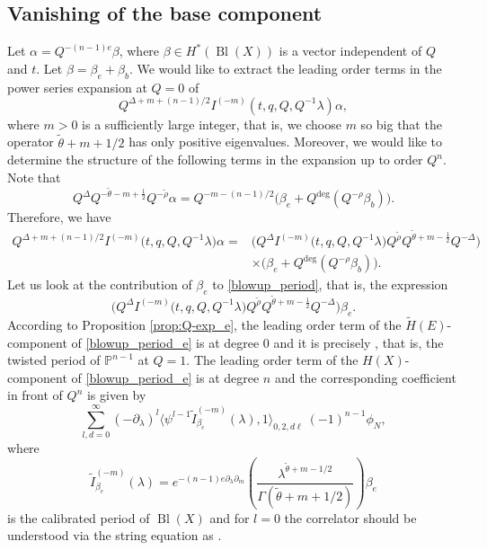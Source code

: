\documentclass[pdftex]{sigma}
\numberwithin{equation}{section}
\newcommand{\leftexp}[2]{{\vphantom{#2}}^{#1}{#2}}
\newcommand{\PP}{\mathbb{P}}
\begin{document}
\subsection{Vanishing of the base component}
Let $\alpha=Q^{-(n-1)e}\beta$, where $\beta \in H^*(\operatorname{Bl}(X))$ is a vector independent of $Q$ and $t$. Let $\beta=\beta_e+\beta_b$. We would like to extract the leading order terms in the power series expansion at $Q=0$ of
\begin{equation}\label{blowup_period}
Q^{\Delta+m+(n-1)/2} I^{(-m)}\left(t,q,Q,Q^{-1}\lambda\right)\alpha,
\end{equation}
where $m>0$ is a sufficiently large integer, that is, we choose $m$ so
big that the operator $\widetilde{\theta}+m+1/2$ has only positive
eigenvalues.
Moreover, we would like to determine the structure of the following terms in the expansion up to order $Q^n$. Note that
\[
Q^{\Delta} Q^{-\widetilde\theta-m+\frac{1}{2}}Q^{-\widetilde\rho}\alpha =
Q^{-m-(n-1)/2} \big(
\beta_e + Q^{\operatorname{deg}} (Q^{-\rho} \beta_b)
\big).
\]
Therefore, we have
\begin{align*}
Q^{\Delta+m+(n-1)/2} I^{(-m)}\big(t,q,Q,Q^{-1}\lambda\big)\alpha={}&
\big(Q^\Delta I^{(-m)}\big(t,q,Q,Q^{-1}\lambda\big)Q^{\widetilde\rho}Q^{\widetilde\theta+m-\frac{1}{2}}Q^{-\Delta}\big)\\
&\times
\big(
\beta_e + Q^{\operatorname{deg}} (Q^{-\rho} \beta_b)
\big).
\end{align*}
Let us look at the contribution of $\beta_e$ to \eqref{blowup_period}, that is, the expression
\begin{equation}\label{blowup_period_e}
\big(Q^\Delta I^{(-m)}\big(t,q,Q,Q^{-1}\lambda\big)Q^{\widetilde\rho}Q^{\widetilde\theta+m-\frac{1}{2}}Q^{-\Delta}\big)
\beta_e.
\end{equation}
According to Proposition \ref{prop:Q-exp_e}, the leading order term of the $\widetilde{H}(E)$-component of \eqref{blowup_period_e} is at degree 0 and it is precisely \smash{$\leftexp{tw}{I}_{\beta_e}^{(-m)}(1,\lambda)$}, that is, the twisted period of $\PP^{n-1}$ at $Q=1$. The leading order term of the $H(X)$-component of \eqref{blowup_period_e} is at degree $n$ and the corresponding coefficient in front of $Q^n$ is given by
\begin{equation}\label{base_blowup_period_be:lot}
\sum_{l,d=0}^\infty
(-\partial_\lambda)^l \big\langle
\psi^{l-1} \widetilde{I}^{(-m)}_{\beta_e}(\lambda), 1\big\rangle_{0,2,d\ell} \
(-1)^{n-1}\phi_N,
\end{equation}
where
\[
\widetilde{I}^{(-m)}_{\beta_e}(\lambda)=
e^{-(n-1)e \partial_\lambda\partial_m} \left(
\frac{\lambda^{\widetilde{\theta}+m-1/2} }{
\Gamma(\widetilde{\theta}+m+1/2)}\right)\beta_e
\]
is the calibrated period of $\operatorname{Bl}(X)$ and for $l=0$ the correlator should be understood via the string equation as .
\end{document}
